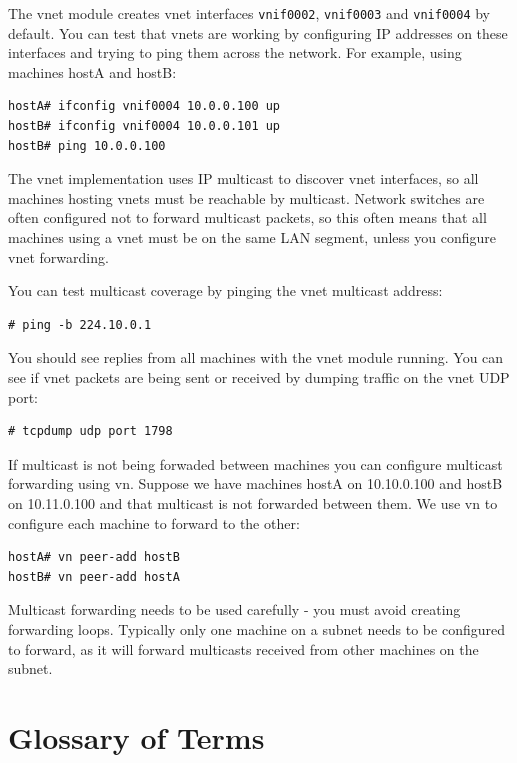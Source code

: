 \documentclass[11pt,twoside,final,openright]{report}
\begin{document}
The vnet module creates vnet interfaces \texttt{vnif0002},
\texttt{vnif0003} and \texttt{vnif0004} by default. You can test that
vnets are working by configuring IP addresses on these interfaces
and trying to ping them across the network. For example, using machines
hostA and hostB:
\begin{verbatim}
hostA# ifconfig vnif0004 10.0.0.100 up
hostB# ifconfig vnif0004 10.0.0.101 up
hostB# ping 10.0.0.100
\end{verbatim}

The vnet implementation uses IP multicast to discover vnet interfaces, so
all machines hosting vnets must be reachable by multicast. Network switches
are often configured not to forward multicast packets, so this often
means that all machines using a vnet must be on the same LAN segment,
unless you configure vnet forwarding.

You can test multicast coverage by pinging the vnet multicast address:
\begin{verbatim}
# ping -b 224.10.0.1
\end{verbatim}
You should see replies from all machines with the vnet module running.
You can see if vnet packets are being sent or received by dumping traffic
on the vnet UDP port:
\begin{verbatim}
# tcpdump udp port 1798
\end{verbatim}

If multicast is not being forwaded between machines you can configure
multicast forwarding using vn. Suppose we have machines hostA on 10.10.0.100
and hostB on 10.11.0.100 and that multicast is not forwarded between them.
We use vn to configure each machine to forward to the other:
\begin{verbatim}
hostA# vn peer-add hostB
hostB# vn peer-add hostA
\end{verbatim}
Multicast forwarding needs to be used carefully - you must avoid creating forwarding
loops. Typically only one machine on a subnet needs to be configured to forward,
as it will forward multicasts received from other machines on the subnet.

\chapter{Glossary of Terms}
\end{document}
